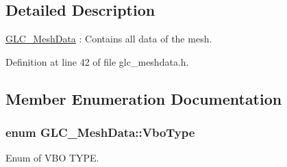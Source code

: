 \subsection{Detailed Description}
\hyperlink{class_g_l_c___mesh_data}{G\-L\-C\-\_\-\-Mesh\-Data} \-: Contains all data of the mesh. 

Definition at line 42 of file glc\-\_\-meshdata.\-h.



\subsection{Member Enumeration Documentation}
\hypertarget{class_g_l_c___mesh_data_aad6ad4c9ec9e7350c0e62cfcb1a95d48}{
\subsubsection[{Vbo\-Type}]{\setlength{\rightskip}{0pt plus 5cm}enum {\bf G\-L\-C\-\_\-\-Mesh\-Data\-::\-Vbo\-Type}}}\label{class_g_l_c___mesh_data_aad6ad4c9ec9e7350c0e62cfcb1a95d48}


Enum of V\-B\-O T\-Y\-P\-E. 


